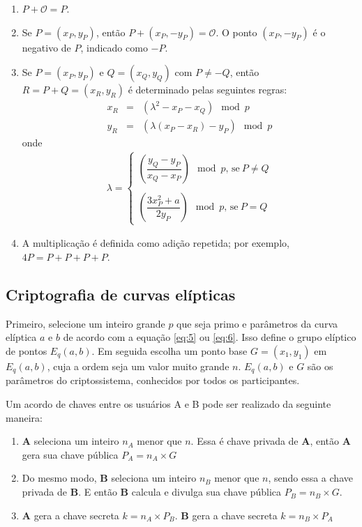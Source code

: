 \begin{enumerate}
  \item $P + \mathcal{O} = P$.
  \item Se $P = (x_P, y_P)$, então $P + (x_P, -y_P) = \mathcal{O}$. O ponto $(x_P, -y_P)$ é o negativo de \(P\), indicado como \(-P\).
  \item Se $P = (x_P, y_P)$ e $Q = (x_Q, y_Q)$ com $P \neq -Q$, então $R = P + Q = (x_R, y_R)$ é determinado pelas seguintes regras:
    \begin{eqnarray*}
    x_R &=& (\lambda^2 - x_P - x_Q) \mod p \\
    y_R &=& (\lambda(x_P - x_R) - y_P) \mod p
    \end{eqnarray*}
  onde
    \begin{eqnarray*}
    \lambda =
    \begin{cases}
    \left(\dfrac{y_Q - y_P}{x_Q - x_P}\right) \mod p \textrm{, se} \ P \neq Q \\ \\
    \left(\dfrac{3x_P^2 + a}{2y_P}\right) \mod p \textrm{, se} \ P = Q
    \end{cases}
    \end{eqnarray*}
  \item A multiplicação é definida como adição repetida; por exemplo, $4P = P + P + P + P$.
\end{enumerate}

%
%
\subsection{Criptografia de curvas elípticas} \label{sec:ecc}
Primeiro, selecione um inteiro grande \(p\) que seja primo e parâmetros da curva elíptica \(a\) e \(b\) de acordo com a equação \ref{eq:5} ou \ref{eq:6}. Isso define o grupo elíptico de pontos $E_q(a, b)$. Em seguida escolha um ponto base $G = (x_1, y_1)$ em $E_q(a, b)$, cuja a ordem seja um valor muito grande \(n\). $E_q(a, b)$ e \(G\) são os parâmetros do criptossistema, conhecidos por todos os participantes.

Um acordo de chaves entre os usuários A e B pode ser realizado da seguinte maneira:
\begin{enumerate}
\item \textbf{A} seleciona um inteiro \(n_A\) menor que \(n\). Essa é chave privada de \textbf{A}, então \textbf{A} gera sua chave pública $P_A = n_A \times G$
\item Do mesmo modo, \textbf{B} seleciona um inteiro \(n_B\) menor que \(n\), sendo essa a chave privada de \textbf{B}. E então \textbf{B} calcula e divulga sua chave pública $P_B = n_B \times G$.
\item \textbf{A} gera a chave secreta $k = n_A \times P_B$. \textbf{B} gera a chave secreta $k = n_B \times P_A$
\end{enumerate}

